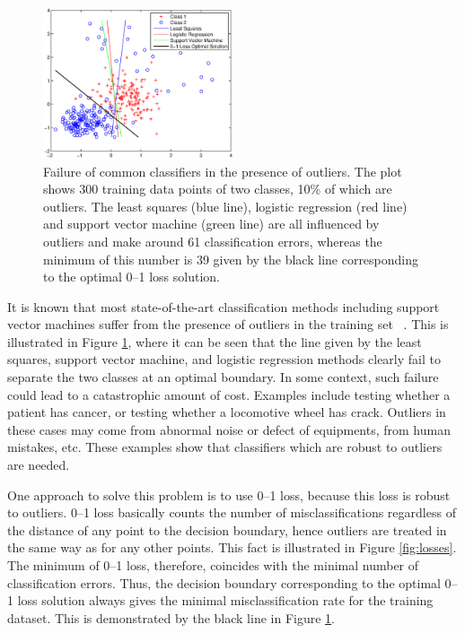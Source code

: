 \begin{figure}[here]
\centering
\includegraphics[width=0.50\textwidth]{images/fig11_svm_failure2.eps}
\caption{
Failure of common classifiers in the presence of outliers. 
The plot shows 300 training data points of two classes, 10\% of which are outliers. The least squares (blue line), logistic regression (red line) and support vector machine (green line) are all influenced by outliers and make around 61 classification errors, whereas the minimum of this number is 39 given by the black line corresponding to the optimal 0--1 loss solution.
}
\label{fig:svm_failure}
\end{figure}

It is known that most state-of-the-art classification methods including support vector machines suffer from the presence of outliers in the training set ~\cite{wu07}. This is illustrated in Figure \ref{fig:svm_failure}, where it can be seen that the line given by the least squares, support vector machine, and logistic regression methods clearly fail to separate the two classes at an optimal boundary. In some context, such failure could lead to a catastrophic amount of cost. Examples include testing whether a patient has cancer, or testing whether a locomotive wheel has crack. Outliers in these cases may come from abnormal noise or defect of equipments, from human mistakes, etc. These examples show that classifiers which are robust to outliers are needed. 

One approach to solve this problem is to use 0--1 loss, because this loss is robust to outliers. 0--1 loss basically counts the number of misclassifications regardless of the distance of any point to the decision boundary, hence outliers are treated in the same way as for any other points. This fact is illustrated in Figure \ref{fig:losses}. The minimum of 0--1 loss, therefore, coincides with the minimal number of classification errors. Thus, the decision boundary corresponding to the optimal 0--1 loss solution always gives the minimal misclassification rate for the training dataset. This is demonstrated by the black line in Figure \ref{fig:svm_failure}.

